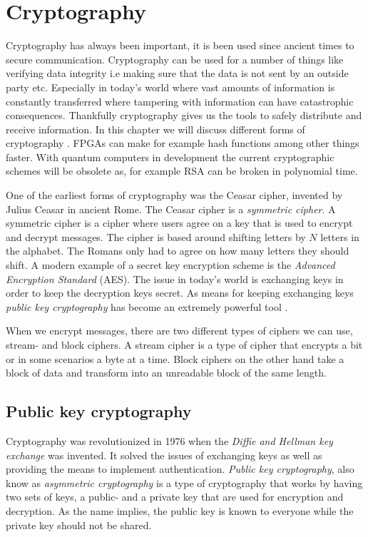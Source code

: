\chapter{Cryptography\label{crypto}}
Cryptography has always been important, it is been used since ancient times to
secure communication. Cryptography can be used for a number of things like
verifying data integrity i.e making sure that the data is not sent by an outside
party etc. Especially in today's world where vast amounts of information is
constantly transferred where tampering with information can have catastrophic
consequences. Thankfully cryptography gives us the tools to safely distribute
and receive information. In this chapter we will discuss different forms of
cryptography . FPGAs can make for example hash functions among other things
faster. With quantum computers in development the current cryptographic schemes
will be obsolete as, for example RSA can be broken in polynomial time.

One of the earliest forms of cryptography was the Ceasar cipher, invented by
Julius Ceasar in ancient Rome. The Ceasar cipher is a \textit{symmetric
cipher}. A symmetric cipher is a cipher where users agree on a key that is used
to encrypt and decrypt messages. The cipher is based around shifting letters by
$N$ letters in the alphabet. The Romans only had to agree on how many letters
they should shift. A modern example of a secret key encryption scheme is the
\textit{Advanced Encryption Standard} (AES). The issue in today's world is
exchanging keys in order to keep the decryption keys secret. As means for
keeping exchanging keys \textit{public key cryptography} has become an
extremely powerful tool \citep{FranciscoRodriguez-Henriquez10}.

When we encrypt messages, there are two different types of ciphers we can use,
stream- and block ciphers. A stream cipher is a type of cipher that encrypts a
bit or in some scenarios a byte at a time. Block ciphers on the other hand take
a block of data and transform into an unreadable block of the same length.


\section{Public key cryptography}
Cryptography was revolutionized in 1976 when the \textit{Diffie and Hellman key
exchange} was invented. It solved the issues of exchanging keys as well as
providing the means to implement authentication. \textit{Public key
cryptography}, also know as \textit{asymmetric cryptography} is a type of
cryptography that works by having two sets of keys, a public- and a private key
that are used for encryption and decryption. As the name implies, the public
key is known to everyone while the private key should not be shared.

